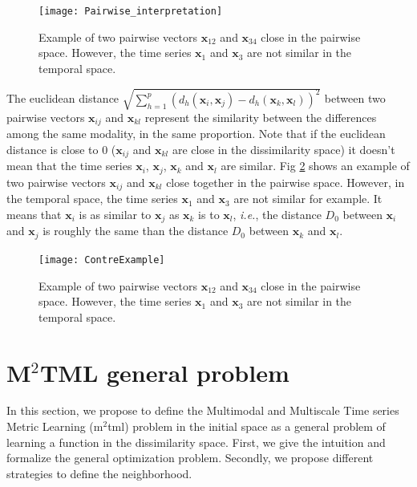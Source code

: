 \begin{figure}[h!]
	\centering
	\texttt{[image: Pairwise\_interpretation]}
	\caption{Example of two pairwise vectors $\textbf{x}_{12}$ and $\textbf{x}_{34}$ close in the pairwise space. However, the time series $\textbf{x}_{1}$ and $\textbf{x}_{3}$ are not similar in the temporal space.}
	\label{fig:pairwise_interpretation}
\end{figure}

The euclidean distance $\sqrt{\sum\limits_{h=1}^{p} (d_h(\textbf{x}_{i},\textbf{x}_{j})-d_h(\textbf{x}_{k},\textbf{x}_{l}))^2}$ between two pairwise vectors $\textbf{x}_{ij}$ and $\textbf{x}_{kl}$ represent the similarity between the differences among the same modality, in the same proportion. Note that if the euclidean distance is close to 0 ($\textbf{x}_{ij}$ and $\textbf{x}_{kl}$ are close in the dissimilarity space) it doesn't mean that the time series $\textbf{x}_{i}$, $\textbf{x}_{j}$, $\textbf{x}_{k}$ and $\textbf{x}_{l}$ are similar. Fig \ref{fig:ContreExample} shows an example of two pairwise vectors $\textbf{x}_{ij}$ and $\textbf{x}_{kl}$ close together in the pairwise space. However, in the temporal space, the time series $\textbf{x}_{1}$ and $\textbf{x}_{3}$ are not similar for example. It means that $\textbf{x}_i$ is as similar to $\textbf{x}_j$ as $\textbf{x}_k$ is to $\textbf{x}_l$, \textit{i.e.}, the distance $D_0$ between $\textbf{x}_i$ and $\textbf{x}_j$ is roughly the same than the distance $D_0$ between $\textbf{x}_k$ and $\textbf{x}_l$.

\begin{figure}[h!]
	\centering
	\texttt{[image: ContreExample]}
	\caption{Example of two pairwise vectors $\textbf{x}_{12}$ and $\textbf{x}_{34}$ close in the pairwise space. However, the time series $\textbf{x}_{1}$ and $\textbf{x}_{3}$ are not similar in the temporal space.}
	\label{fig:ContreExample}
\end{figure}




\section{M$^2$TML general problem}
In this section, we propose to define the Multimodal and Multiscale Time series Metric Learning ({\sc m$^2$tml}) problem in the initial space as a general problem of learning a function in the dissimilarity space. First, we give the intuition and formalize the general optimization problem. Secondly, we propose different strategies to define the neighborhood.

